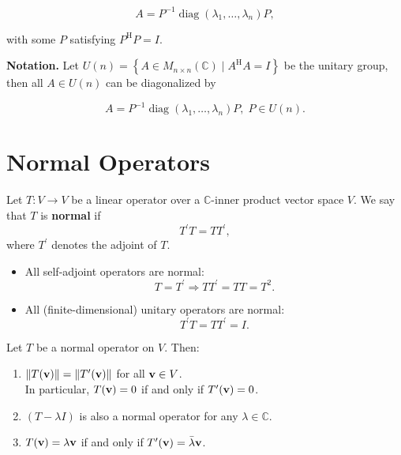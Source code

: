 \[
A = P^{-1}\operatorname{diag}\left( {{\lambda }_{1},\ldots ,{\lambda }_{n}}\right) P,
\]

with some \(P\) satisfying \(P^{\mathrm{H}}P = I\).

\textbf{Notation.} Let \(U\left( n\right)  = \left\{  {A \in  {M}_{n \times  n}\left( \mathbb{C}\right)  \mid  {A}^{\mathrm{H}}A = I}\right\}\) be the unitary group, then all \(A \in  U\left( n\right)\) can be diagonalized by

\[
A = {P}^{-1}\operatorname{diag}\left( {{\lambda }_{1},\ldots ,{\lambda }_{n}}\right) P,\;P \in  U\left( n\right) .
\]

\section{Normal Operators}

\begin{definition}
Let \( T : V \to V \) be a linear operator over a \( \mathbb{C} \)-inner product vector space \( V \). We say that \( T \) is \textbf{normal} if
\[
T^\prime T = T T^\prime,
\]
where \( T^\prime \) denotes the adjoint of \( T \).
\end{definition}

\begin{example}\leavevmode
\begin{itemize}
    \item All self-adjoint operators are normal:
    \[
    T = T^\prime \Rightarrow T T^\prime = T T = T^2.
    \]

    \item All (finite-dimensional) unitary operators are normal:
    \[
    T^\prime T = T T^\prime = I.
    \]
\end{itemize}
\end{example}

\begin{proposition}
Let \( T \) be a normal operator on \( V \). Then:
\begin{enumerate}
    \item \( \|T({\bf v})\| = \|T'({\bf v})\| \) for all \( {\bf v} \in V \).\\
    In particular, \( T({\bf v}) = 0 \) if and only if \( T'({\bf v}) = 0 \).
    
    \item \( (T - \lambda I) \) is also a normal operator for any \( \lambda \in \mathbb{C} \).

    \item \( T({\bf v}) = \lambda {\bf v} \) if and only if \( T'({\bf v}) = \bar{\lambda} {\bf v} \).
\end{enumerate}
\end{proposition}

